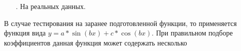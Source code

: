 {\begin{itemize}[leftmargin=2.15cm, labelwidth=0.65cm, labelsep=0.0cm]
		\item[\theitemcntr. ] На реальных данных.
		\addtocounter{itemcntr}{1}
		
		\setcounter{itemcntr}{1}
	\end{itemize}  
	
	\par \redline В случае тестирования на заранее подготовленной функции, то применяется функция вида $y = a * \sin (bx) + c * \cos (bx)$. При правильном подборе коэффициентов данная функция может содержать несколько 
	
	\par \redline  
	
	
	
	\par
	
	
}


\setcounter{subchaptercntr}{1}
\setcounter{formulacntr}{1}
\setcounter{imagecntr}{1}
\setcounter{tablecntr}{1}

